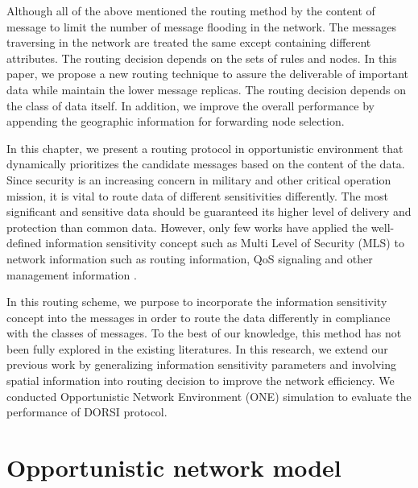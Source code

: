 Although all of the above mentioned the routing method by the content of message to limit the number of message flooding in the network. The messages traversing in the network are treated the same except containing different attributes. The routing decision depends on the sets of rules and nodes. In this paper, we propose a new routing technique to assure the deliverable of important data while maintain the lower message replicas. The routing decision depends on the class of data itself. In addition, we improve the overall performance by appending the geographic information for forwarding node selection.

In this chapter, we present a routing protocol in opportunistic environment that dynamically prioritizes the candidate messages based on the content of the data. Since security is an increasing concern in military and other critical operation mission, it is vital to route data of different sensitivities differently. The most significant and sensitive data should be guaranteed its higher level of delivery and protection than common data. However, only few works have applied the well-defined information sensitivity concept such as Multi Level of Security (MLS) \cite{Kotrappa2010,marking2010} to network information such as routing information, QoS signaling and other management information \cite{Winjum2008}.

In this routing scheme, we purpose to incorporate the information sensitivity concept into the messages in order to route the data differently in compliance with the classes of messages. To the best of our knowledge, this method has not been fully explored in the existing literatures. In this research, we extend our previous work \cite{Kerdsri2012} by generalizing information sensitivity parameters and involving spatial information into routing decision to improve the network efficiency. We conducted Opportunistic Network Environment (ONE) simulation \cite{Keranen2009b} to evaluate the performance of DORSI protocol.

\section{Opportunistic network model}
\label{DORSI:Opportunistic network model}

